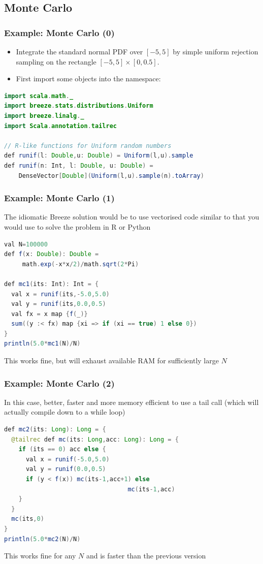 \documentclass[mathserif,handout]{beamer}
\begin{document}
\subsection{Monte Carlo}

\begin{frame}[fragile]
\frametitle{Example: Monte Carlo (0)}
\begin{itemize}
\item Integrate the standard normal PDF over $[-5,5]$ by simple uniform rejection sampling on the rectangle $[-5,5]\times[0,0.5]$.
\item First import some objects into the namespace:
\end{itemize}
{\scriptsize
\begin{lstlisting}[language=java]
import scala.math._
import breeze.stats.distributions.Uniform
import breeze.linalg._
import Scala.annotation.tailrec

// R-like functions for Uniform random numbers
def runif(l: Double,u: Double) = Uniform(l,u).sample
def runif(n: Int, l: Double, u: Double) = 
    DenseVector[Double](Uniform(l,u).sample(n).toArray)
\end{lstlisting}} 
\end{frame}

\begin{frame}[fragile]
\frametitle{Example: Monte Carlo (1)}
The idiomatic Breeze solution would be to use vectorised code similar to that you would use to solve the problem in R or Python
{\small
\begin{lstlisting}[language=java]
val N=100000
def f(x: Double): Double = 
     math.exp(-x*x/2)/math.sqrt(2*Pi)

def mc1(its: Int): Int = {
  val x = runif(its,-5.0,5.0)
  val y = runif(its,0.0,0.5)
  val fx = x map {f(_)}
  sum((y :< fx) map {xi => if (xi == true) 1 else 0})
}
println(5.0*mc1(N)/N)
\end{lstlisting}}
This works fine, but will exhaust available RAM for sufficiently large $N$
\end{frame}

\begin{frame}[fragile]
\frametitle{Example: Monte Carlo (2)}
In this case, better, faster and more memory efficient to use a tail call (which will actually compile down to a while loop)
{\small
\begin{lstlisting}[language=java]
def mc2(its: Long): Long = {
  @tailrec def mc(its: Long,acc: Long): Long = {
    if (its == 0) acc else {
      val x = runif(-5.0,5.0)
      val y = runif(0.0,0.5)
      if (y < f(x)) mc(its-1,acc+1) else 
                                  mc(its-1,acc)
    }  
  }
  mc(its,0)
}
println(5.0*mc2(N)/N)
\end{lstlisting}}
This works fine for any $N$ and is faster than the previous version
\end{frame}
\end{document}
